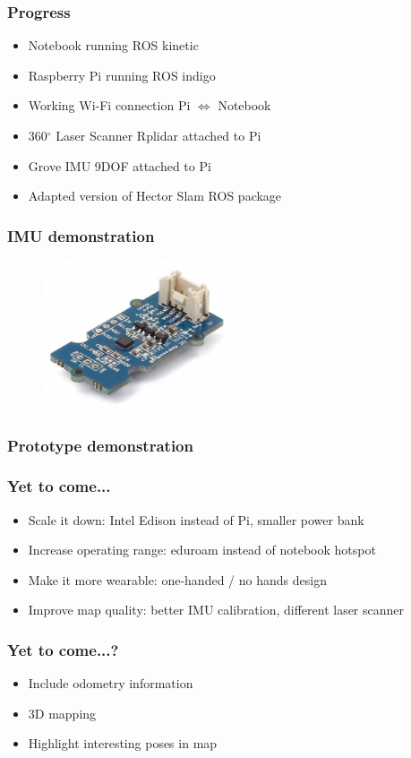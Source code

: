 \documentclass{beamer}
\begin{document}
\begin{frame}
\frametitle{Progress}
\begin{itemize}
\item Notebook running ROS kinetic 
\pause
\item Raspberry Pi running ROS indigo 
\pause
\item Working Wi-Fi connection Pi $\Leftrightarrow$ Notebook 
\pause
\item 360$^{\circ}$ Laser Scanner Rplidar attached to Pi
\pause
\item Grove IMU 9DOF attached to Pi
\pause
\item Adapted version of Hector Slam ROS package
\end{itemize}
\end{frame}


\begin{frame}
\frametitle{IMU demonstration}
\begin{figure}
\begin{center}
\includegraphics[width=0.5\textwidth]{IMU.JPG}
\end{center}
\end{figure}
\end{frame}


\begin{frame}
\frametitle{Prototype demonstration}
\end{frame}


\begin{frame}
\frametitle{Yet to come...}
\begin{itemize}
\item Scale it down: Intel Edison instead of Pi, smaller power bank
\item Increase operating range: eduroam instead of notebook hotspot
\item Make it more wearable: one-handed / no hands design
\item Improve map quality: better IMU calibration, different laser scanner
\end{itemize}
\end{frame}


\begin{frame}
\frametitle{Yet to come...?}
\begin{itemize}
\item Include odometry information
\item 3D mapping
\item Highlight interesting poses in map
\end{itemize}
\end{frame}
\end{document}
